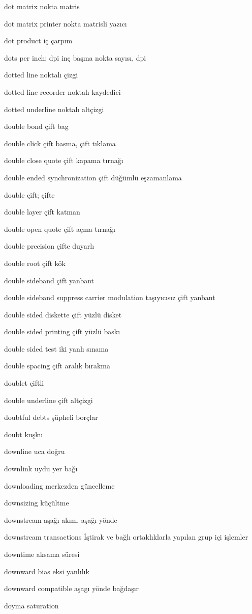\documentclass[12pt,fleqn]{article}\usepackage{../../common}
\begin{document}
dot matrix nokta matris

dot matrix printer nokta matrisli yazıcı

dot product iç çarpım

dots per inch; dpi inç başına nokta sayısı, dpi

dotted line noktalı çizgi

dotted line recorder noktalı kaydedici

dotted underline noktalı altçizgi

double bond çift bag

double click çift basma, çift tıklama

double close quote çift kapama tırnağı

double ended synchronization çift düğümlü eşzamanlama

double çift; çifte

double layer çift katman

double open quote çift açma tırnağı

double precision çifte duyarlı

double root çift kök

double sideband çift yanbant

double sideband suppress carrier modulation taşıyıcısız çift yanbant

double sided diskette çift yüzlü disket

double sided printing çift yüzlü baskı

double sided test iki yanlı sınama

double spacing çift aralık bırakma

doublet çiftli

double underline çift altçizgi

doubtful debts şüpheli borçlar

doubt kuşku

downline uca doğru

downlink uydu yer bağı

downloading merkezden güncelleme

downsizing küçültme

downstream aşağı akım, aşağı yönde

downstream transactions İştirak ve bağlı ortaklıklarla yapılan grup içi işlemler 

downtime aksama süresi

downward bias eksi yanlılık

downward compatible aşagı yönde bağdaşır

doyma saturation
\end{document}
